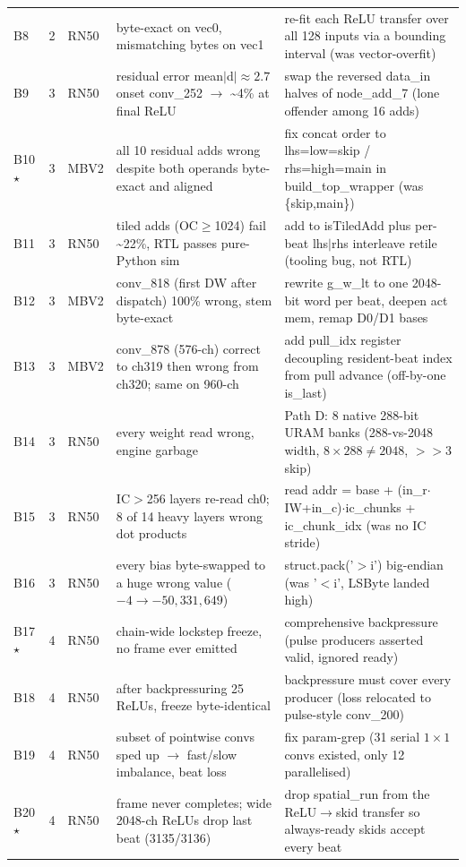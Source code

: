 \documentclass[acmtog,authorversion]{acmart}
\begin{document}
\begin{longtable}{@{}l l l p{} p{}@{}}
B8 & 2 & RN50 & byte-exact on vec0, mismatching bytes on vec1 & re-fit each ReLU transfer over all 128 inputs via a bounding interval (was vector-overfit) \\
B9 & 3 & RN50 & residual error mean$|$d$|\approx2.7$ onset conv\_252 $\rightarrow$ \textasciitilde{}4\% at final ReLU & swap the reversed data\_in halves of node\_add\_7 (lone offender among 16 adds) \\
B10 $\star$ & 3 & MBV2 & all 10 residual adds wrong despite both operands byte-exact and aligned & fix concat order to lhs=low=skip / rhs=high=main in build\_top\_wrapper (was \{skip,main\}) \\
B11 & 3 & RN50 & tiled adds (OC$\geq$1024) fail \textasciitilde{}22\%, RTL passes pure-Python sim & add to isTiledAdd plus per-beat lhs$|$rhs interleave retile (tooling bug, not RTL) \\
B12 & 3 & MBV2 & conv\_818 (first DW after dispatch) 100\% wrong, stem byte-exact & rewrite g\_w\_lt to one 2048-bit word per beat, deepen act mem, remap D0/D1 bases \\
B13 & 3 & MBV2 & conv\_878 (576-ch) correct to ch319 then wrong from ch320; same on 960-ch & add pull\_idx register decoupling resident-beat index from pull advance (off-by-one is\_last) \\
B14 & 3 & RN50 & every weight read wrong, engine garbage & Path D: 8 native 288-bit URAM banks (288-vs-2048 width, $8\times288\neq2048$, $>>$3 skip) \\
B15 & 3 & RN50 & IC$>$256 layers re-read ch0; 8 of 14 heavy layers wrong dot products & read addr = base + (in\_r$\cdot$IW+in\_c)$\cdot$ic\_chunks + ic\_chunk\_idx (was no IC stride) \\
B16 & 3 & RN50 & every bias byte-swapped to a huge wrong value ($-4 \rightarrow -50{,}331{,}649$) & struct.pack('$>$i') big-endian (was '$<$i', LSByte landed high) \\
B17 $\star$ & 4 & RN50 & chain-wide lockstep freeze, no frame ever emitted & comprehensive backpressure (pulse producers asserted valid, ignored ready) \\
B18 & 4 & RN50 & after backpressuring 25 ReLUs, freeze byte-identical & backpressure must cover every producer (loss relocated to pulse-style conv\_200) \\
B19 & 4 & RN50 & subset of pointwise convs sped up $\rightarrow$ fast/slow imbalance, beat loss & fix param-grep (31 serial $1\times1$ convs existed, only 12 parallelised) \\
B20 $\star$ & 4 & RN50 & frame never completes; wide 2048-ch ReLUs drop last beat (3135/3136) & drop spatial\_run from the ReLU$\rightarrow$skid transfer so always-ready skids accept every beat \\

\end{longtable}
\end{document}
